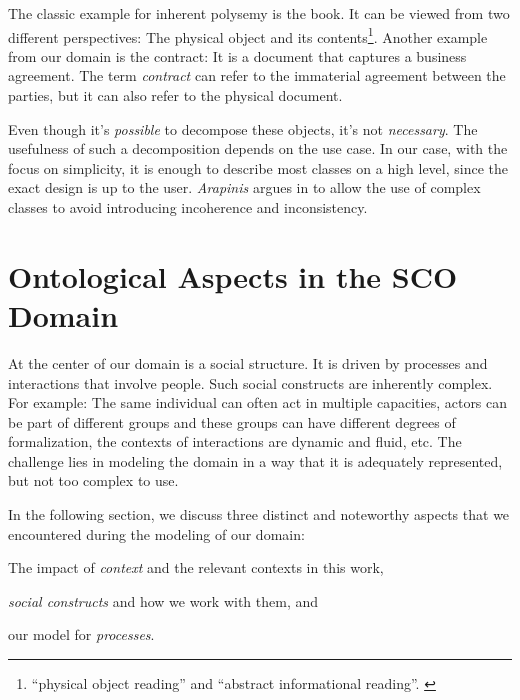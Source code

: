 \documentclass[a4paper, DIV=13, BCOR=0cm]{scrbook}
\begin{document}
The classic example for inherent polysemy is the book. It can be viewed from two different perspectives: The physical object and its contents\footnote{\enquote{physical object reading} and \enquote{abstract informational reading}. \cite[Section 2.1]{arapinis2015plea}}. Another example from our domain is the contract: It is a document that captures a business agreement. The term \textit{contract} can refer to the immaterial agreement between the parties, but it can also refer to the physical document.

Even though it's \textit{possible} to decompose these objects, it's not \textit{necessary}. The usefulness of such a decomposition depends on the use case. In our case, with the focus on simplicity, it is enough to describe most classes on a high level, since the exact design is up to the user. \textit{Arapinis} argues in \cite{arapinis2015plea} to allow the use of complex classes to avoid introducing incoherence and inconsistency.


\chapter[Ontological Aspects in the SCO Domain \\\textcolor{gray}{
	{\footnotesize \textsl{Discusses the three major concepts and their implementation in the context of related work.}}
}]{Ontological Aspects in the SCO Domain}
\label{domain-aspects}
At the center of our domain is a social structure. It is driven by processes and interactions that involve people. Such social constructs are inherently complex. For example: The same individual can often act in multiple capacities, actors can be part of different groups and these groups can have different degrees of formalization, the contexts of interactions are dynamic and fluid, etc. The challenge lies in modeling the domain in a way that it is adequately represented, but not too complex to use.

In the following section, we discuss three distinct and noteworthy aspects that we encountered during the modeling of our domain:
\begin{inparablank}
	\item The impact of \textit{context} and the relevant contexts in this work,
	\item \textit{social constructs} and how we work with them, and
	\item our model for \textit{processes}.
\end{inparablank}
\end{document}
